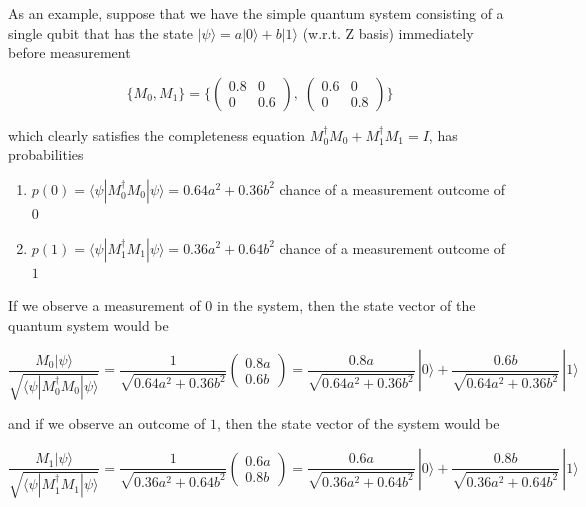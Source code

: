 \documentclass{article}
\begin{document}
    
    \begin{example}
      As an example, suppose that we have the simple quantum system consisting of a single qubit that has the state $|\psi \rangle = a|0\rangle + b|1 \rangle$  (w.r.t. Z basis) immediately before measurement

        \[\{M_0, M_1\} = \bigg\{ \begin{pmatrix} 0.8 & 0 \\  0 & 0.6 \end{pmatrix}, \; \begin{pmatrix} 0.6&0\\0&0.8 \end{pmatrix} \bigg\}\]

      which clearly satisfies the completeness equation $M_0^\dagger M_0 + M_1^\dagger M_1 = I$, has probabilities

      \begin{enumerate}
        \item $p(0) = \langle \psi | M_0^\dagger M_0 | \psi \rangle = 0.64 a^2 + 0.36b^2$ chance of a measurement outcome of $0$
        \item $p(1) = \langle \psi | M_1^\dagger M_1 | \psi \rangle = 0.36 a^2 + 0.64b^2$ chance of a measurement outcome of $1$
      \end{enumerate}

      If we observe a measurement of $0$ in the system, then the state vector of the quantum system would be

        \[\frac{M_0 | \psi\rangle}{\sqrt{\langle \psi | M_0^\dagger M_0 | \psi\rangle}} = \frac{1}{\sqrt{0.64a^2 + 0.36b^2}} \begin{pmatrix} 0.8a \\ 0.6b \end{pmatrix} = \frac{0.8a}{\sqrt{0.64a^2 + 0.36b^2}}\, |0 \rangle + \frac{0.6 b}{\sqrt{0.64a^2 + 0.36b^2}} \, |1\rangle\]

      and if we observe an outcome of $1$, then the state vector of the system would be

        \[\frac{M_1 | \psi\rangle}{\sqrt{\langle \psi | M_1^\dagger M_1 | \psi\rangle}} = \frac{1}{\sqrt{0.36a^2 + 0.64b^2}} \begin{pmatrix} 0.6a \\ 0.8b \end{pmatrix} = \frac{0.6a}{\sqrt{0.36a^2 + 0.64b^2}}\, |0 \rangle + \frac{0.8 b}{\sqrt{0.36a^2 + 0.64b^2}} \, |1\rangle\]
    \end{example}
\end{document}
